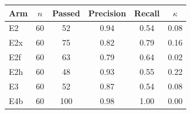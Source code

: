 \begin{tabular}{@{}lccccc@{}}
\toprule
Arm & $n$ & Passed & Precision & Recall & $\kappa$ \\
\midrule
E2 & 60 & 52 & 0.94 & 0.54 & 0.08 \\
E2x & 60 & 75 & 0.82 & 0.79 & 0.16 \\
E2f & 60 & 63 & 0.79 & 0.64 & 0.02 \\
E2h & 60 & 48 & 0.93 & 0.55 & 0.22 \\
E3 & 60 & 52 & 0.87 & 0.54 & 0.08 \\
E4b & 60 & 100 & 0.98 & 1.00 & 0.00 \\
\bottomrule
\end{tabular}
